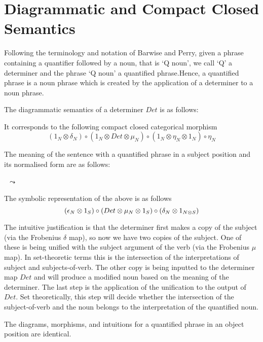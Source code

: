 \section{Diagrammatic and Compact Closed Semantics}


Following the terminology and notation of Barwise and  Perry, given a phrase containing a quantifier followed by a noun, that is `Q noun', we call `Q' a determiner and the phrase `Q noun' a quantified  phrase.Hence,  a quantified phrase is a noun phrase which is created by the application of a determiner to a noun phrase.  


The diagrammatic semantics of a determiner $Det$ is as follows:

\begin{center}
\end{center}

\noindent
It corresponds to the following compact closed categorical morphism
{\small
\[
(1_N \otimes \delta_N) \circ (1_N \otimes Det \otimes \mu_N) \circ (1_N \otimes \eta_N \otimes 1_N) \circ \eta_N 
\]}

\noindent
The meaning of the sentence with a quantified phrase in a subject position and its normalised form are as follows:


\begin{minipage}{20cm}
\begin{minipage}{7cm}
\end{minipage}
\ $\leadsto$ \
\begin{minipage}{5cm}
\end{minipage}
\end{minipage}


\noindent
The symbolic representation of the above is as follows
\[{\small
(\epsilon_N \otimes 1_S) \circ (Det \otimes  \mu_N \otimes 1_S) \circ (\delta_N \otimes 1_{N \otimes S})}
\]


The intuitive justification  is that the determiner first makes a copy of the subject (via the Frobenius $\delta$ map), so now we have two copies of the subject. One of these is being unified with the subject argument of the verb (via the Frobenius $\mu$ map). In set-theoretic terms this is the intersection of the interpretations of subject and subjects-of-verb. The other copy is being inputted to the determiner map $Det$ and will produce a modified noun based on the meaning of the determiner.  The last step is the application of the unification to the output of $Det$. Set theoretically, this step will decide whether the intersection of the subject-of-verb and the noun belongs to the interpretation of the quantified noun. 

 
The diagrams,  morphisms, and intuitions for a quantified phrase in an object position are identical.

